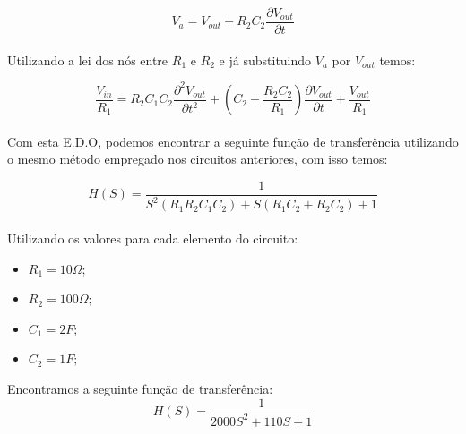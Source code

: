 \documentclass[a4paper, 12pt]{article}
\begin{document}
			\[
			V_{a} = V_{out} + R_{2}C_{2}\frac{\partial V_{out}}{\partial t}
			\] 	\\					
			
			Utilizando a lei dos nós entre $R_{1}$ e $R_{2}$ e já substituindo $V_{a}$ por $V_{out}$ temos:
			
			\[
			\frac{V_{in}}{R_{1}} = R_{2}C_{1}C_{2}\frac{\partial^{2} V_{out}}{\partial t^{2}} + \left(C_{2} + \frac{R_{2}C_{2}}{R_{1}}\right)\frac{\partial V_{out}}{\partial t} +  \frac{V_{out}}{R_{1}}
			\] 	\\			
			
			Com esta E.D.O, podemos encontrar a seguinte função de transferência utilizando o mesmo método empregado nos circuitos anteriores, com isso temos:
			
			\[
			H(S) = \frac{1}{S^{2}\left(R_{1}R_{2}C_{1}C_{2}\right) + S\left(R_{1}C_{2} + R_{2}C_{2}\right) + 1}
			\] 	\\					
			
			Utilizando os valores para cada elemento do circuito:
			\begin{itemize}
				\item $R_{1} = 10\Omega;$
				\item $R_{2} = 100\Omega;$
				\item $C_{1} = 2F;$
				\item $C_{2} = 1F;$
			\end{itemize}				

			Encontramos a seguinte função de transferência:
			\[
			H(S) = \frac{1}{2000S^{2} + 110S + 1}
			\] 	\\				
			
\end{document}
